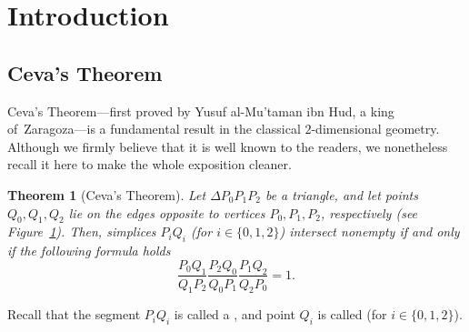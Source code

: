 \documentclass[12pt, reqno]{amsart}
\newtheorem{theorem}{Theorem}[section]
\theoremstyle{definition}
\theoremstyle{remark}
\numberwithin{equation}{section}
\begin{document}
{\section{Introduction}

\subsection{Ceva's Theorem}\label{Ceva's theorem}
Ceva's Theorem---first proved by Yusuf al-Mu'taman ibn Hud, a king of~Zaragoza---is a fundamental result in the classical $2$-dimensional geometry. Although we firmly believe that it is well known to the readers, we nonetheless recall it here to make the whole exposition cleaner.

\begin{theorem}[Ceva's Theorem]
  Let $\Delta P_0P_1P_2$ be a triangle, and let points $Q_0,Q_1,Q_2$ lie on the edges opposite to vertices $P_0,P_1,P_2$, respectively \textup(see Figure~\ref{fig:trojkat_punkty_Q}\textup). Then, simplices $P_iQ_{i}$ \textup(for $i\in\{0,1,2\}$\textup) intersect nonempty if and only if the following formula holds
  \[
  \frac{P_0Q_1}{Q_1P_2}\frac{P_2Q_0}{Q_0P_1}\frac{P_1Q_2}{Q_2P_0}=1.
  \]
\end{theorem}

Recall that the segment $P_iQ_{i}$ is called a , and point $Q_{i}$ is called  (for $i\in\{0,1,2\}$).
\begin{figure}\label{fig:trojkat_punkty_Q}
  \centering
\end{figure}}
\end{document}
